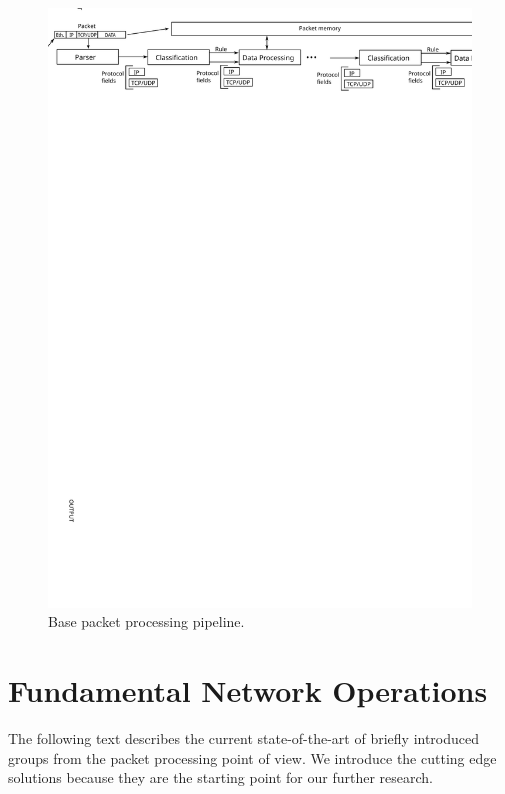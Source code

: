 \begin{figure}[ht]
	\centering
	\includegraphics[width=\textwidth]{chapters/pic/frame_data_process}
	\caption{Base packet processing pipeline.}
	\label{fig:packetProc}
\end{figure}


\section{Fundamental Network Operations}

The following text describes the current state-of-the-art of briefly introduced groups from the packet processing point of view. 
We introduce the cutting edge solutions because they are the starting point for our further research.

